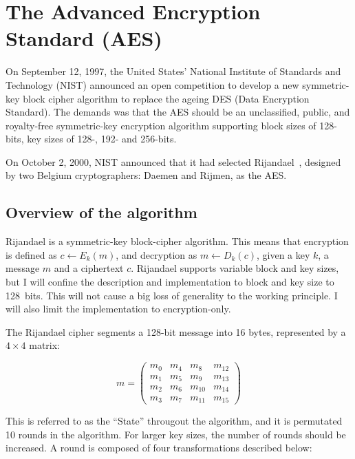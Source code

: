 \section{The Advanced Encryption Standard (AES)}

On September 12, 1997, the United States' National Institute of
Standards and Technology (NIST) announced an open competition to
develop a new symmetric-key block cipher algorithm to replace the
ageing DES (Data Encryption Standard). The demands was that the AES
should be an unclassified, public, and royalty-free symmetric-key
encryption algorithm supporting block sizes of 128-bits, key sizes of
128-, 192- and 256-bits.

On October 2, 2000, NIST announced that it had selected
Rijandael~\cite{rijandael}, designed by two Belgium cryptographers:
Daemen and Rijmen, as the AES.

\subsection{Overview of the algorithm}

Rijandael is a symmetric-key block-cipher algorithm. This means that
encryption is defined as $c \leftarrow E_k(m)$, and decryption as $m
\leftarrow D_k(c)$, given a key $k$, a message $m$ and a ciphertext
$c$. Rijandael supports variable block and key sizes, but I will
confine the description and implementation to block and key size to
128~bits. This will not cause a big loss of generality to the working
principle. I will also limit the implementation to encryption-only.

The Rijandael cipher segments a 128-bit message into 16 bytes,
represented by a $4 \times 4$ matrix:

\begin{equation}
  m = \begin{pmatrix}
    m_0 & m_4 & m_8 & m_12 \\
    m_1 & m_5 & m_9 & m_13 \\
    m_2 & m_6 & m_10 & m_14 \\
    m_3 & m_7 & m_11 & m_15
    \end{pmatrix}
\end{equation}

This is referred to as the ``State'' througout the algorithm, and it
is permutated 10 rounds in the algorithm. For larger key sizes, the
number of rounds should be increased. A round is composed of four
transformations described below:

